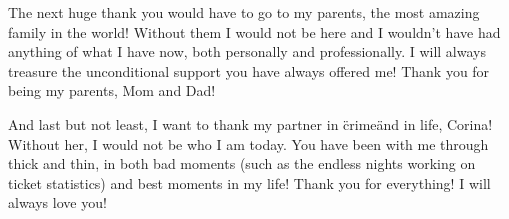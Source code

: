 \documentclass{mpaper}
\begin{document}
The next huge thank you would have to go to my parents, the most amazing family in the world! Without them I would 
not be here and I wouldn't have had anything of what I have now, both personally and professionally. 
I will always treasure the unconditional support you have always offered me! Thank you for being my parents, Mom and Dad!

And last but not least, I want to thank my partner in \"crime\" and in life, Corina! Without her, I would not be who I 
am today. You have been with me through thick and thin, in both bad moments (such as the endless nights working 
on ticket statistics) and best moments in my life! Thank you for everything! I will always love you!



\end{document}
